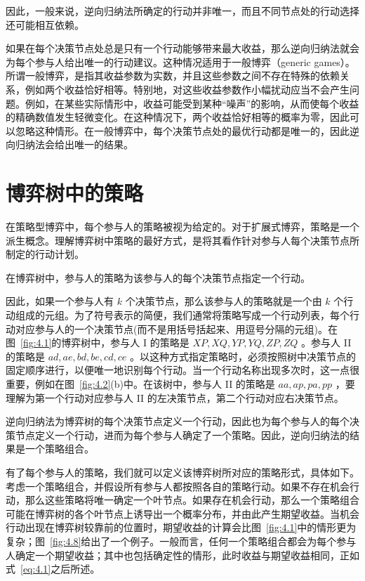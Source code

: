 因此，一般来说，逆向归纳法所确定的行动并非唯一，而且不同节点处的行动选择还可能相互依赖。

如果在每个决策节点处总是只有一个行动能够带来最大收益，那么逆向归纳法就会为每个参与人给出唯一的行动建议。这种情况适用于一般博弈（generic games）。所谓一般博弈，是指其收益参数为实数，并且这些参数之间不存在特殊的依赖关系，例如两个收益恰好相等。特别地，对这些收益参数作小幅扰动应当不会产生问题。例如，在某些实际情形中，收益可能受到某种“噪声”的影响，从而使每个收益的精确数值发生轻微变化。在这种情况下，两个收益恰好相等的概率为零，因此可以忽略这种情形。在一般博弈中，每个决策节点处的最优行动都是唯一的，因此逆向归纳法会给出唯一的结果。

\section{博弈树中的策略}

在策略型博弈中，每个参与人的策略被视为给定的。对于扩展式博弈，策略是一个派生概念。理解博弈树中策略的最好方式，是将其看作针对参与人每个决策节点所制定的行动计划。

\begin{definition}\label{def:4.3}
    在博弈树中，参与人的策略为该参与人的每个决策节点指定一个行动。
\end{definition} 

因此，如果一个参与人有 \(k\) 个决策节点，那么该参与人的策略就是一个由 \(k\) 个行动组成的元组。为了符号表示的简便，我们通常将策略写成一个行动列表，每个行动对应参与人的一个决策节点(而不是用括号括起来、用逗号分隔的元组)。在图~\ref{fig:4.1}的博弈树中，参与人 I 的策略是 \({XP},{XQ},{YP},{YQ},{ZP},{ZQ}\) 。参与人 II 的策略是 \({ad},{ae},{bd}, {be}, {cd},{ce}\) 。以这种方式指定策略时，必须按照树中决策节点的固定顺序进行，以便唯一地识别每个行动。当一个行动名称出现多次时，这一点很重要，例如在图~\ref{fig:4.2}(b)中。在该树中，参与人 II 的策略是 \({aa},{ap},{pa},{pp}\) ，要理解为第一个行动对应参与人 II 的左决策节点，第二个行动对应右决策节点。

逆向归纳法为博弈树的每个决策节点定义一个行动，因此也为每个参与人的每个决策节点定义一个行动，进而为每个参与人确定了一个策略。因此，逆向归纳法的结果是一个策略组合。

有了每个参与人的策略，我们就可以定义该博弈树所对应的策略形式，具体如下。考虑一个策略组合，并假设所有参与人都按照各自的策略行动。如果不存在机会行动，那么这些策略将唯一确定一个叶节点。如果存在机会行动，那么一个策略组合可能在博弈树的各个叶节点上诱导出一个概率分布，并由此产生期望收益。当机会行动出现在博弈树较靠前的位置时，期望收益的计算会比图~\ref{fig:4.1}中的情形更为复杂；图~\ref{fig:4.8}给出了一个例子。一般而言，任何一个策略组合都会为每个参与人确定一个期望收益；其中也包括确定性的情形，此时收益与期望收益相同，正如式~\eqref{eq:4.1}之后所述。

